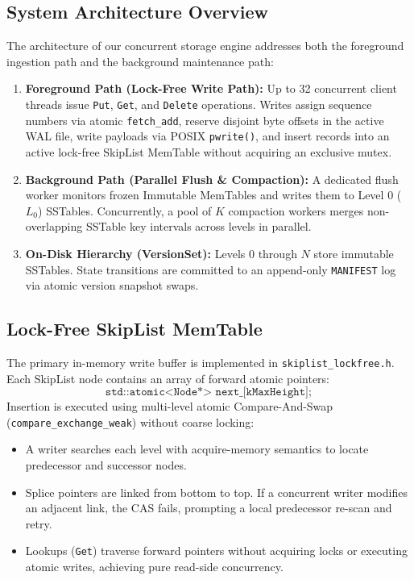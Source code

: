 \documentclass[conference]{IEEEtran}
\begin{document}
\subsection{System Architecture Overview}
The architecture of our concurrent storage engine addresses both the foreground ingestion path and the background maintenance path:
\begin{enumerate}
    \item \textbf{Foreground Path (Lock-Free Write Path):} Up to 32 concurrent client threads issue \texttt{Put}, \texttt{Get}, and \texttt{Delete} operations. Writes assign sequence numbers via atomic \texttt{fetch\_add}, reserve disjoint byte offsets in the active WAL file, write payloads via POSIX \texttt{pwrite()}, and insert records into an active lock-free SkipList MemTable without acquiring an exclusive mutex.
    \item \textbf{Background Path (Parallel Flush \& Compaction):} A dedicated flush worker monitors frozen Immutable MemTables and writes them to Level 0 ($L_0$) SSTables. Concurrently, a pool of $K$ compaction workers merges non-overlapping SSTable key intervals across levels in parallel.
    \item \textbf{On-Disk Hierarchy (VersionSet):} Levels 0 through $N$ store immutable SSTables. State transitions are committed to an append-only \texttt{MANIFEST} log via atomic version snapshot swaps.
\end{enumerate}

\subsection{Lock-Free SkipList MemTable}
The primary in-memory write buffer is implemented in \texttt{skiplist\_lockfree.h}. Each SkipList node contains an array of forward atomic pointers:
\begin{equation}
\texttt{std::atomic<Node*> next\_[kMaxHeight]};
\end{equation}
Insertion is executed using multi-level atomic Compare-And-Swap (\texttt{compare\_exchange\_weak}) without coarse locking:
\begin{itemize}
    \item A writer searches each level with acquire-memory semantics to locate predecessor and successor nodes.
    \item Splice pointers are linked from bottom to top. If a concurrent writer modifies an adjacent link, the CAS fails, prompting a local predecessor re-scan and retry.
    \item Lookups (\texttt{Get}) traverse forward pointers without acquiring locks or executing atomic writes, achieving pure read-side concurrency.
\end{itemize}
\end{document}
